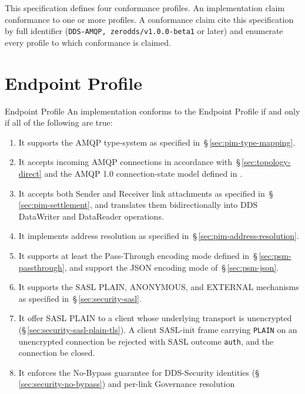 \documentclass{../styles/zerodds-vendor-spec}
\begin{document}
This specification defines four conformance profiles. An
implementation  claim conformance to one or more profiles.
A conformance claim  cite this specification by full
identifier (\texttt{DDS-AMQP, zerodds/v1.0.0-beta1} or later) and
enumerate every profile to which conformance is claimed.

\section{Endpoint Profile}\label{sec:profile-endpoint}

\begin{conformance}{Endpoint Profile}
An implementation conforms to the Endpoint Profile if and only if all
of the following are true:
\begin{enumerate}
  \item It supports the AMQP type-system as specified
        in~\S\,\ref{sec:pim-type-mapping}.
  \item It accepts incoming AMQP connections in accordance
        with~\S\,\ref{sec:topology-direct} and the AMQP 1.0
        connection-state model defined in
        .
  \item It accepts both Sender and Receiver link attachments
        as specified in~\S\,\ref{sec:pim-settlement}, and translates
        them bidirectionally into DDS DataWriter and DataReader
        operations.
  \item It implements address resolution as specified
        in~\S\,\ref{sec:pim-address-resolution}.
  \item It supports at least the Pass-Through encoding mode
        defined in~\S\,\ref{sec:psm-passthrough}, and 
        support the JSON encoding mode of~\S\,\ref{sec:psm-json}.
  \item It supports the SASL PLAIN, ANONYMOUS, and EXTERNAL
        mechanisms as specified in~\S\,\ref{sec:security-sasl}.
  \item It  offer SASL PLAIN to a client whose
        underlying transport is unencrypted
        (\S\,\ref{sec:security-sasl-plain-tls}). A client SASL-init
        frame carrying \texttt{PLAIN} on an unencrypted connection
         be rejected with SASL outcome \texttt{auth},
        and the connection  be closed.
  \item It enforces the No-Bypass guarantee for DDS-Security
        identities (\S\,\ref{sec:security-no-bypass}) and
        per-link Governance resolution

\end{enumerate}
\end{conformance}
\end{document}
